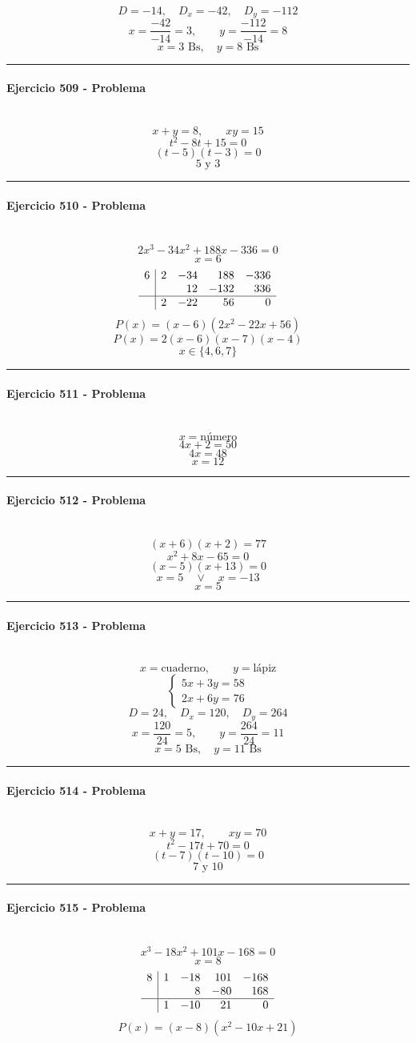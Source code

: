 \documentclass[10pt,a4paper]{article}
\newcommand{\res}[1]{\paragraph{#1}\mbox{}\\[-1.2em]}
\begin{document}
\[ D=-14,\quad D_x=-42,\quad D_y=-112 \]
\[ x=\frac{-42}{-14}=3,\qquad y=\frac{-112}{-14}=8 \]
\[ \boxed{x=3\text{ Bs},\quad y=8\text{ Bs}} \]
\vspace{1mm}\hrule\vspace{2mm}
\res{Ejercicio 509 - Problema}
\[ x+y=8,\qquad xy=15 \]
\[ t^2-8t+15=0 \]
\[ (t-5)(t-3)=0 \]
\[ \boxed{5\text{ y }3} \]
\vspace{1mm}\hrule\vspace{2mm}
\res{Ejercicio 510 - Problema}
\[ 2 x^{3} - 34 x^{2} + 188 x - 336=0 \]
\[ x=6 \]
\[\begin{array}{r|rrrr}6 & 2 & -34 & 188 & -336\\  &  & 12 & -132 & 336\\\hline  & 2 & -22 & 56 & 0\end{array}\]
\[ P(x)=(x-6)(2 x^{2} - 22 x + 56) \]
\[ P(x)=2(x-6)(x-7)(x-4) \]
\[ \boxed{x\in\{4,6,7\}} \]
\vspace{1mm}\hrule\vspace{2mm}
\res{Ejercicio 511 - Problema}
\[ x=\text{número} \]
\[ 4x+2=50 \]
\[ 4x=48 \]
\[ \boxed{x=12} \]
\vspace{1mm}\hrule\vspace{2mm}
\res{Ejercicio 512 - Problema}
\[ (x+6)(x+2)=77 \]
\[ x^{2} + 8 x - 65=0 \]
\[ (x-5)(x+13)=0 \]
\[ x=5\quad \vee \quad x=-13 \]
\[ \boxed{x=5} \]
\vspace{1mm}\hrule\vspace{2mm}
\res{Ejercicio 513 - Problema}
\[ x=\text{cuaderno},\qquad y=\text{lápiz} \]
\[ \begin{cases}5x+3y=58\\2x+6y=76\end{cases} \]
\[ D=24,\quad D_x=120,\quad D_y=264 \]
\[ x=\frac{120}{24}=5,\qquad y=\frac{264}{24}=11 \]
\[ \boxed{x=5\text{ Bs},\quad y=11\text{ Bs}} \]
\vspace{1mm}\hrule\vspace{2mm}
\res{Ejercicio 514 - Problema}
\[ x+y=17,\qquad xy=70 \]
\[ t^2-17t+70=0 \]
\[ (t-7)(t-10)=0 \]
\[ \boxed{7\text{ y }10} \]
\vspace{1mm}\hrule\vspace{2mm}
\res{Ejercicio 515 - Problema}
\[ x^{3} - 18 x^{2} + 101 x - 168=0 \]
\[ x=8 \]
\[\begin{array}{r|rrrr}8 & 1 & -18 & 101 & -168\\  &  & 8 & -80 & 168\\\hline  & 1 & -10 & 21 & 0\end{array}\]
\[ P(x)=(x-8)(x^{2} - 10 x + 21) \]
\end{document}
